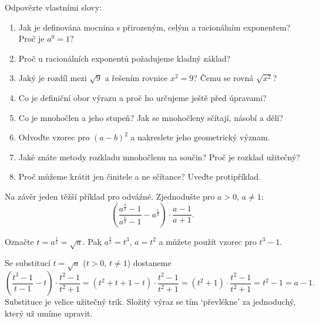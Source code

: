 \begin{problem}
  Odpovězte vlastními slovy:
  \begin{enumerate}
    \item Jak je definována mocnina s přirozeným, celým a racionálním exponentem? Proč je $a^0 = 1$?
    \item Proč u racionálních exponentů požadujeme kladný základ?
    \item Jaký je rozdíl mezi $\sqrt{9}$ a řešením rovnice $x^2 = 9$? Čemu se rovná $\sqrt{x^2}$?
    \item Co je definiční obor výrazu a proč ho určujeme ještě před úpravami?
    \item Co je mnohočlen a jeho stupeň? Jak se mnohočleny sčítají, násobí a dělí?
    \item Odvoďte vzorec pro ${(a - b)}^2$ a nakreslete jeho geometrický význam.
    \item Jaké znáte metody rozkladu mnohočlenu na součin? Proč je rozklad užitečný?
    \item Proč můžeme krátit jen činitele a ne sčítance? Uveďte protipříklad.
  \end{enumerate}
\end{problem}

\begin{problem}
  Na závěr jeden těžší příklad pro odvážné. Zjednodušte pro $a > 0$, $a\neq 1$:
  \begin{equation*}
    \left(\frac{a^{\frac{3}{2}} - 1}{a^{\frac{1}{2}} - 1} - a^{\frac{1}{2}}\right)\cdot\frac{a - 1}{a + 1}.
  \end{equation*}
\end{problem}

\begin{hint}
  Označte $t = a^{\frac{1}{2}} = \sqrt{a}$. Pak $a^{\frac{3}{2}} = t^3$, $a = t^2$ a můžete použít vzorec pro $t^3 - 1$.
\end{hint}

\begin{solution}
  Se substitucí $t = \sqrt{a}$ ($t > 0$, $t\neq 1$) dostaneme
  \begin{equation*}
    \left(\frac{t^3 - 1}{t - 1} - t\right)\cdot\frac{t^2 - 1}{t^2 + 1} = \left(t^2 + t + 1 - t\right)\cdot\frac{t^2 - 1}{t^2 + 1} = (t^2 + 1)\cdot\frac{t^2 - 1}{t^2 + 1} = t^2 - 1 = a - 1.
  \end{equation*}
  Substituce je velice užitečný trik. Složitý výraz se tím `převlékne' za jednoduchý, který už umíme upravit.
\end{solution}

